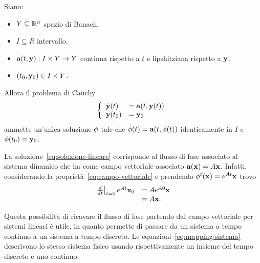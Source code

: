 \begin{thm}
    Siano:
    \begin{itemize}
        \item $Y \subseteq \mathbb{R}^n$ spazio di Banach.%
        \item $I \subseteq R$ intervallo.%
        \item $\mathbf{a}(t, \mathbf{y}) : I \times Y \to Y$ continua rispetto a $t$ e lipshitziana rispetto a $\mathbf{y}$.%
        \item $(t_0, \mathbf{y}_0) \in I \times Y$.
    \end{itemize}
    Allora il problema di Cauchy
    \begin{equation*}
        \left\{
            \begin{array}{ll}
                \dot{\mathbf{y}}(t) &= \mathbf{a}(t, \mathbf{y} (t)) \\
                \mathbf{y} (t_0) &= \mathbf{y}_0
            \end{array}
        \right.
    \end{equation*}
    ammette un'unica soluzione $\mathbf{\phi}$ tale che $\dot {\mathbf{\phi}}(t) = \mathbf{a}(t, \mathbf{\phi}(t))$
    identicamente in $I$ e $\mathbf{\phi}(t_0) = \mathbf{y}_0$.
    \label{thm:esistenza-unicità}
\end{thm}

La soluzione~\eqref{eq:soluzione-lineare}
corrisponde al flusso di fase associato al sistema dinamico che ha come campo vettoriale
associato $\mathbf{a}(\mathbf{x}) = A\mathbf{x}$.
Infatti, considerando la proprietà~\eqref{eq:campo-vettoriale} e prendendo
$\phi^t(\mathbf{x}) = e^{At} \mathbf{x}$ trovo
\begin{equation*}
    \begin{array}{ll}
        \left. \frac d{dt} \right|_{t=0} e^{At} \mathbf{x}_0 &= A e^{A0} \mathbf{x}  \\
        &= A \mathbf{x}.
    \end{array}
\end{equation*}


Questa possibilità di ricavare il flusso di fase partendo dal campo vettoriale per
sistemi lineari è utile, in quanto permette di passare da un sistema a tempo continuo
a un sistema a tempo discreto.
Le equazioni~\eqref{eq:mapping-sistema} descrivono lo stesso sistema fisico usando
rispettivamente un insieme del tempo discreto e uno continuo.

